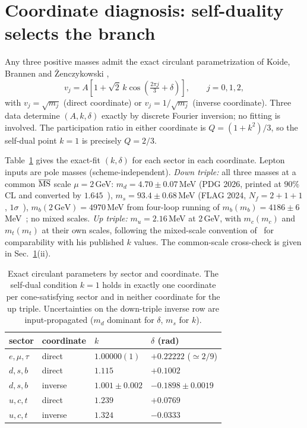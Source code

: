\documentclass[11pt]{article}
\begin{document}
\section{Coordinate diagnosis: self-duality selects the branch}
\label{sec:diagnosis}

Any three positive masses admit the exact circulant parametrization of
Koide, Brannen and \.{Z}enczykowski \cite{Brannen,Zen2012,Zen2013},
\begin{equation}
v_j = A\left[1+\sqrt{2}\,k\cos\!\left(\tfrac{2\pi j}{3}+\delta\right)\right],
\qquad j = 0,1,2,
\label{eq:circulant}
\end{equation}
with $v_j = \sqrt{m_j}$ (direct coordinate) or $v_j = 1/\sqrt{m_j}$ (inverse
coordinate). Three data determine $(A,k,\delta)$ exactly by discrete Fourier
inversion; no fitting is involved. The participation ratio in either coordinate is $Q = (1+k^2)/3$, so the self-dual point $k=1$ is precisely $Q = 2/3$.

Table~\ref{tab:k} gives the exact-fit $(k,\delta)$ for each sector in each
coordinate. Lepton inputs are pole masses (scheme-independent).
\emph{Down triple:} all three masses at a common $\overline{\rm MS}$ scale
$\mu = 2$\,GeV: $m_d = 4.70\pm0.07$\,MeV (PDG 2026, printed at $90\%$\,CL
and converted by $1.645$~\cite{PDG}), $m_s = 93.4\pm0.68$\,MeV (FLAG 2024,
$N_f{=}2{+}1{+}1$, $1\sigma$~\cite{FLAG}), $m_b(2\,\mathrm{GeV}) = 4970$\,MeV from
four-loop running of $m_b(m_b) = 4186\pm6$\,MeV~\cite{CRunDec}; no mixed scales.
\emph{Up triple:} $m_u = 2.16$\,MeV at $2$\,GeV, with $m_c(m_c)$ and $m_t(m_t)$
at their own scales, following the mixed-scale convention
of~\cite{Zen2012} for comparability with his published $k$ values. The
common-scale cross-check is given in Sec.~\ref{sec:diagnosis}(ii).

\begin{table}[t]
\caption{Exact circulant parameters by sector and coordinate. The self-dual condition $k=1$ holds in exactly one coordinate per cone-satisfying sector and in neither coordinate for the up triple. Uncertainties on the down-triple inverse row
are input-propagated ($m_d$ dominant for $\delta$, $m_s$ for $k$).}
\label{tab:k}

\begin{tabular}{llll}\toprule
sector & coordinate & $k$ & $\delta$ (rad) \\
\midrule
$e,\mu,\tau$ & direct  & $1.00000(1)$ & $+0.22222$ ($\simeq 2/9$) \\
$d,s,b$      & direct  & $1.115$   & $+0.1002$ \\
$d,s,b$      & inverse & $1.001\pm0.002$ & $-0.1898\pm0.0019$ \\
$u,c,t$      & direct  & $1.239$   & $+0.0769$ \\
$u,c,t$      & inverse & $1.324$   & $-0.0333$ \\
\bottomrule\end{tabular}

\end{table}
\end{document}
